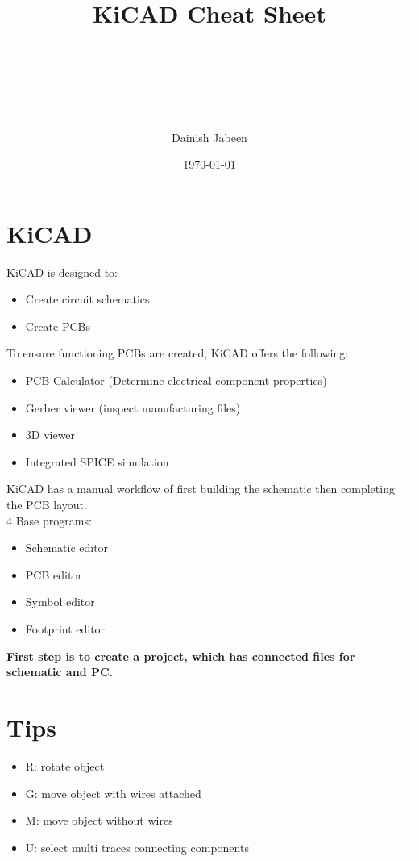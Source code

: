 \documentclass[11pt]{scrartcl} %
\title{	
	\normalfont\normalsize
	\vspace{20pt} %
	{\huge KiCAD Cheat Sheet}\\ %
	\vspace{12pt} %
	\rule{\linewidth}{2pt}\\ %
}
\author{\small Dainish Jabeen} %
\date{\normalsize\today} %
\begin{document}
\maketitle %

\section{KiCAD}

KiCAD is designed to:
\begin{itemize}
	\item Create circuit schematics
	\item Create PCBs
\end{itemize}

To ensure functioning PCBs are created, KiCAD offers the following:
\begin{itemize}
	\item PCB Calculator (Determine electrical component properties)
	\item Gerber viewer (inspect manufacturing files)
	\item 3D viewer
	\item Integrated SPICE simulation
\end{itemize}

KiCAD has a manual workflow of first building the schematic then completing the PCB layout.\\

4 Base programs:
\begin{itemize}
	\item Schematic editor
	\item PCB editor
	\item Symbol editor
	\item Footprint editor
\end{itemize}

\textbf{First step is to create a project, which has connected files for schematic and PC.}

\section{Tips}

\begin{itemize}
	\item R: rotate object
	\item G: move object with wires attached
	\item M: move object without wires
	\item U: select multi traces connecting components
\end{itemize}
\end{document}
